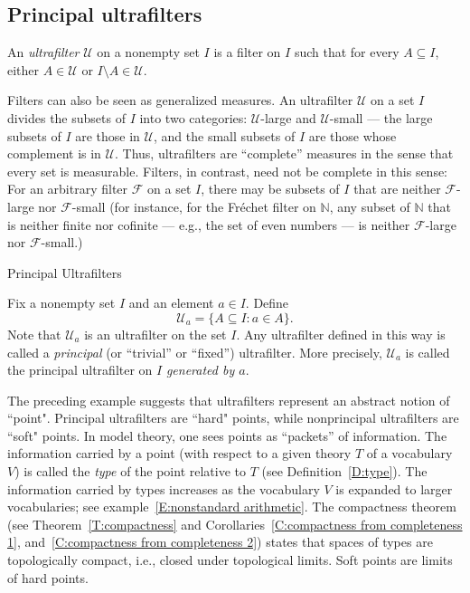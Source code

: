 \documentclass{scrartcl}
\begin{document}
\subsection{Principal ultrafilters}


\begin{definition}
An \emph{ultrafilter} $\mathscr{U}$ on a nonempty set $I$ is a filter on $I$ such that for every $A\subseteq I$, either $A\in \mathscr{U}$ or $I\setminus A\in \mathscr{U}$.
\end{definition}

Filters can also be seen as generalized measures. An ultrafilter $\mathscr{U}$ on a set $I$ divides the subsets of $I$ into two categories: $\mathscr{U}$-large and $\mathscr{U}$-small --- the large subsets of $I$ are those in $\mathscr{U}$, and the small subsets of $I$ are those whose complement is in $\mathscr{U}$. Thus, ultrafilters are ``complete'' measures in the sense that every set is measurable. Filters, in contrast, need not be complete in this sense: For an arbitrary filter $\mathscr{F}$ on a set $I$, there may be subsets of $I$ that are neither $\mathscr{F}$-large nor $\mathscr{F}$-small (for instance, for the Fr\'{e}chet filter on $\mathbb N$, any subset of $\mathbb N$ that is neither finite nor cofinite --- e.g., the set of even numbers --- is neither $\mathscr{F}$-large nor $\mathscr{F}$-small.)


\begin{example} Principal Ultrafilters

Fix a nonempty set $I$ and an element $a\in I$. Define 
\[
\mathscr{U}_a=\{A\subseteq I \colon a\in A\}.
\]
Note that $\mathscr{U}_a$ is an ultrafilter on the set $I$. Any ultrafilter defined in this way is called a \emph{principal} (or ``trivial'' or ``fixed'') ultrafilter. More precisely, $\mathscr{U}_a$ is called the principal ultrafilter on $I$ \emph{generated by $a$}.
\end{example}

The preceding example suggests that ultrafilters represent an abstract notion of ``point". Principal ultrafilters are ``hard" points, while nonprincipal ultrafilters are ``soft" points. In model theory, one sees points as ``packets'' of information. The information carried by a point (with respect to a given theory $T$ of a vocabulary $V$) is called the \emph{type} of the point relative to $T$ (see Definition~\ref{D:type}). The information carried by types increases as the vocabulary $V$ is expanded to larger vocabularies; see example~\ref{E:nonstandard arithmetic}. The compactness theorem (see Theorem~\ref{T:compactness} and Corollaries~\ref{C:compactness from completeness 1}, and~\ref{C:compactness from completeness 2}) states that spaces of types are topologically compact, i.e., closed under topological limits. Soft points are limits of hard points.
\end{document}
